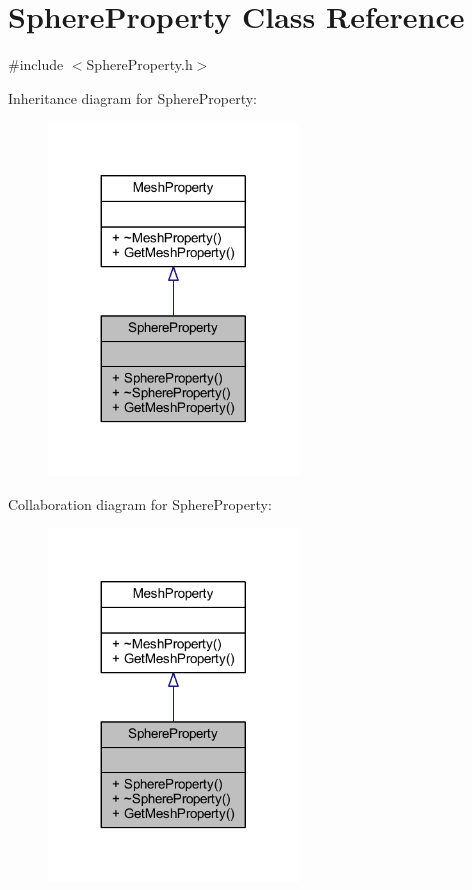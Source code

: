\hypertarget{class_sphere_property}{}\section{Sphere\+Property Class Reference}
\label{class_sphere_property}


{\ttfamily \#include $<$Sphere\+Property.\+h$>$}



Inheritance diagram for Sphere\+Property\+:
\nopagebreak
\begin{figure}[H]
\begin{center}
\leavevmode
\includegraphics[width=188pt]{class_sphere_property__inherit__graph}
\end{center}
\end{figure}


Collaboration diagram for Sphere\+Property\+:
\nopagebreak
\begin{figure}[H]
\begin{center}
\leavevmode
\includegraphics[width=188pt]{class_sphere_property__coll__graph}
\end{center}
\end{figure}
